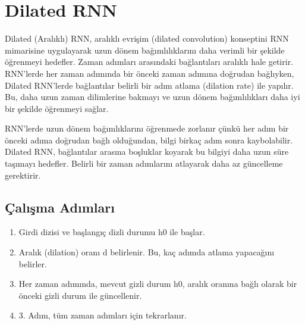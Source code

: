 \section{Dilated RNN}
Dilated (Aralıklı) RNN, aralıklı evrişim (dilated convolution) konseptini RNN mimarisine uygulayarak uzun dönem bağımlılıklarını daha verimli bir şekilde öğrenmeyi hedefler. Zaman adımları arasındaki bağlantıları aralıklı hale getirir. RNN'lerde her zaman adımında bir önceki zaman adımına doğrudan bağlıyken, Dilated RNN'lerde bağlantılar belirli bir adım atlama (dilation rate) ile yapılır. Bu, daha uzun zaman dilimlerine bakmayı ve uzun dönem bağımlılıkları daha iyi bir şekilde öğrenmeyi sağlar.

RNN'lerde uzun dönem bağımlıklarını öğrenmede zorlanır çünkü her adım bir önceki adıma doğrudan bağlı olduğundan, bilgi birkaç adım sonra kaybolabilir. Dilated RNN, bağlantılar arasına boşluklar koyarak bu bilgiyi daha uzun süre taşımayı hedefler. Belirli bir zaman adımlarını atlayarak daha az güncelleme gerektirir.

\subsection{Çalışma Adımları}
\begin{enumerate}
	\item Girdi dizisi ve başlangıç dizli durumu h0 ile başlar.
	\item Aralık (dilation) oranı d belirlenir. Bu, kaç adımda atlama yapacağını belirler.
	\item Her zaman adımında, mevcut gizli durum h0, aralık oranına bağlı olarak bir önceki gizli durum ile güncellenir.
	\item 3. Adım, tüm zaman adımları için tekrarlanır.
\end{enumerate}

\newpage